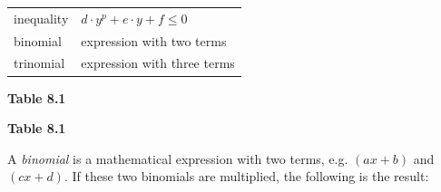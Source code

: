 \begin{table}[H]
\begin{center}
\begin{xtabular}[t]{|l|l|}
        inequality &
                  $d\ensuremath{\cdot}{y}^{p}+e\ensuremath{\cdot}y+f\le 0$
     \tabularnewline{}
        binomial &
        expression with two terms%
     \tabularnewline{}
        trinomial &
        expression with three terms%
     \tabularnewline{}
    \end{xtabular}
      \end{center}
    \begin{center}{\small\bfseries Table 8.1}\end{center}
    \begin{caption}{\small\bfseries Table 8.1}\end{caption}
\end{table}
    \par
      \label{m39383*uid4}
            \nopagebreak
        \label{m39383*id268015}A \textsl{binomial} is a mathematical expression with two terms, e.g. $\left(ax+b\right)$ and $\left(cx+d\right)$. If these two binomials are multiplied, the following is the result:\par 
        \label{m39383*id268064}\nopagebreak\noindent{}
